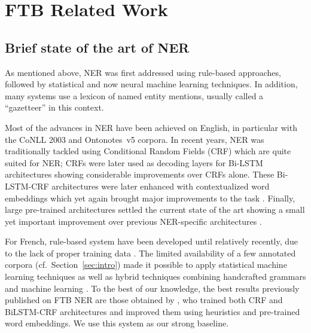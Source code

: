 \chapter{FTB Related Work}


\section{Brief state of the art of NER}
\label{subsec:sota}

As mentioned above, NER was first addressed using rule-based approaches, followed by statistical and now neural machine learning techniques. In addition, many systems use a lexicon of named entity mentions, usually called a ``gazetteer'' in this context.

Most of the advances in NER  have been achieved on English, in particular with the CoNLL 2003 \cite{tjong-kim-sang-de-meulder-2003-introduction} and  Ontonotes~v5 \cite{pradhan-etal-2012-conll,pradhan-etal-2013-towards} corpora. In recent years, NER was traditionally tackled using Conditional Random Fields (CRF) \cite{lafferty-etal-2001-conditional} which are quite suited for NER; CRFs were later used as decoding layers for Bi-LSTM architectures \cite{huang-etal-2015-bidirectional,lample-etal-2016-neural} showing considerable improvements over CRFs alone. These Bi-LSTM-CRF architectures were later enhanced with contextualized word embeddings which yet again brought major improvements to the task \cite{peters-etal-2018-deep,akbik-etal-2018-contextual}. Finally, large pre-trained architectures settled the current state of the art showing a small yet important improvement over previous NER-specific architectures \cite{devlin-etal-2019-bert,baevski-etal-2019-cloze}.

For French, rule-based system have been developed until relatively recently, due to the lack of proper training data \cite{sekine-nobata-2004-definition,rosset-etal-2005-interaction,stern-sagot-2010-resources,nouvel-etal-2014-pattern}. The limited availability of a few annotated corpora (cf.~Section~\ref{sec:intro}) made it possible to apply statistical machine learning techniques \cite{bechet-charton-2010-unsupervised,dupont-tellier-2014-named,dupont-2017-exploration} as well as hybrid techniques combining handcrafted grammars and machine learning \cite{bechet-etal-2011-cooperation}. To the best of our knowledge, the best results previously published on FTB NER are those obtained by , who trained both CRF and BiLSTM-CRF architectures and improved them using heuristics and pre-trained word embeddings. We use this system as our strong baseline.

